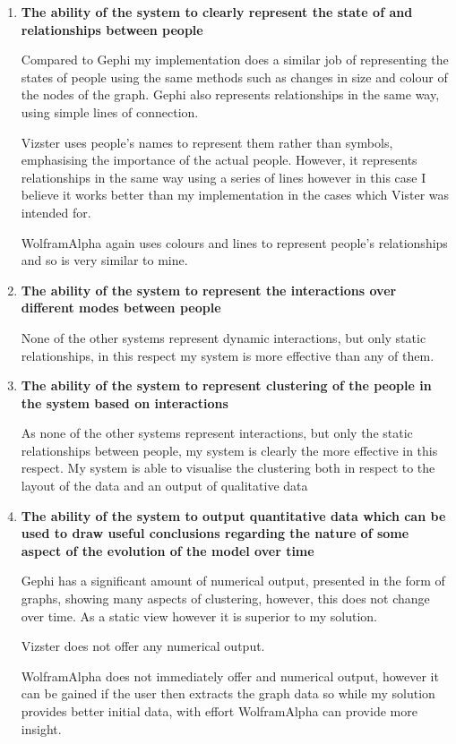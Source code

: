 \documentclass[12pt,a4paper]{article}
\begin{document}
\begin{enumerate}
	\item {\bf The ability of the system to clearly represent the state of and relationships between people}
	
	Compared to Gephi my implementation does a similar job of representing the states of people using the same methods such as changes in size and colour of the nodes of the graph. Gephi also represents relationships in the same way, using simple lines of connection.
	
	Vizster uses people's names to represent them rather than symbols, emphasising the importance of the actual people. However, it represents relationships in the same way using a series of lines however in this case I believe it works better than my implementation in the cases which Vister was intended for.
	
	WolframAlpha again uses colours and lines to represent people's relationships and so is very similar to mine.
	
	\item {\bf The ability of the system to represent the interactions over different modes between people}
	
	None of the other systems represent dynamic interactions, but only static relationships, in this respect my system is more effective than any of them.
	
	\item {\bf The ability of the system to represent clustering of the people in the system based on interactions}
	
	As none of the other systems represent interactions, but only the static relationships between people, my system is clearly the more effective in this respect. My system is able to visualise the clustering both in respect to the layout of the data and an output of qualitative data
	
	\item {\bf The ability of the system to output quantitative data which can be used to draw useful conclusions regarding the nature of some aspect of the evolution of the model over time}
	
	Gephi has a significant amount of numerical output, presented in the form of graphs, showing many aspects of clustering, however, this does not change over time. As a static view however it is superior to my solution.
	
	Vizster does not offer any numerical output.
	
	WolframAlpha does not immediately offer and numerical output, however it can be gained if the user then extracts the graph data so while my solution provides better initial data, with effort WolframAlpha can provide more insight.
\end{enumerate}
\end{document}
